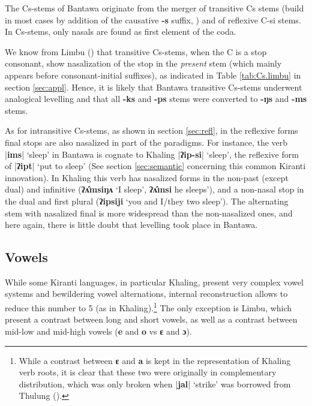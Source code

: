 \documentclass[oneside,a4paper,11pt]{article}
\newcommand{\ipa}[1]{\textbf{{\phon\mbox{#1}}}} %
\newcommand{\dhatu}[2]{|\ipa{#1}| `#2'}
\begin{document}
The Cs-stems of Bantawa originate from the merger of transitive Cs stems (build in most cases by addition of the causative \ipa{-s} suffix, \citealt{michailovsky85dental}) and of reflexive C-si stems. In Cs-stems, only nasals are found as first element of the coda. 

We know from Limbu (\citealt[xiii]{michailovsky02dico}) that transitive Cs-stems, when the C is a stop consonant, show nasalization of the stop in the \textit{present} stem (which mainly appears before consonant-initial suffixes), as indicated in Table \ref{tab:Cs.limbu} in section \ref{sec:appl}. Hence, it is likely that Bantawa transitive Cs-stems underwent analogical levelling and that all \ipa{-ks} and \ipa{-ps} stems were converted to \ipa{-ŋs} and \ipa{-ms} stems.

As for intransitive Cs-stems, as shown in section \ref{sec:refl}, in the reflexive forms final stops are also nasalized in part of the paradigms. For instance, the verb \dhatu{ims}{sleep} in Bantawa is cognate to Khaling \dhatu{ʔip-si}{sleep}, the reflexive form of \dhatu{ʔipt}{put to sleep} (See section \ref{sec:semantic} concerning this common Kiranti innovation). In Khaling this verb has nasalized forms in the non-past (except dual) and infinitive (\ipa{ʔʌ̂msiŋʌ} `I sleep', \ipa{ʔʌ̂msi} he sleeps'), and a non-nasal stop in the dual and first plural (\ipa{ʔipsiji} `you and I/they two sleep'). The alternating stem with nasalized final is more widespread than the non-nasalized ones, and here again, there is little doubt that levelling took place in Bantawa.

\subsection{Vowels} \label{sec:vowels}

While some Kiranti languages, in particular Khaling, present very complex vowel systems and bewildering vowel alternations, internal reconstruction allows to reduce this number to 5 (as in Khaling).\footnote{While a contrast between \ipa{ɛ} and \ipa{a} is kept in the representation of Khaling verb roots, it is clear that these two were originally in complementary distribution, which was only broken when \dhatu{jal}{strike} was borrowed from Thulung (\citealt[1110]{jacques12khaling}).} The only exception is Limbu, which present a contrast between long and short vowels, as well as a contrast between mid-low and mid-high vowels (\ipa{e} and \ipa{o} vs \ipa{ɛ} and \ipa{ɔ}).  
\end{document}
